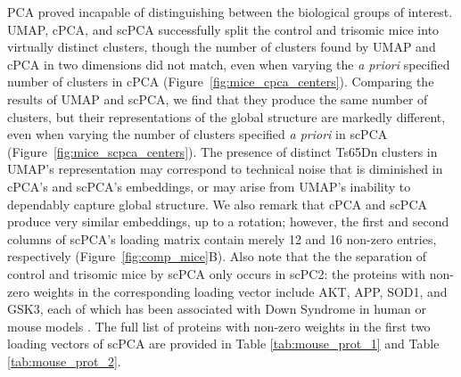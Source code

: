 \documentclass{article}
\begin{document}
PCA proved incapable of distinguishing between the biological groups of interest. UMAP, cPCA, and scPCA successfully split the control and trisomic mice into virtually distinct clusters, though the number of clusters found by UMAP and cPCA in two dimensions did not match, even when varying the \textit{a priori} specified number of clusters in cPCA (Figure~\ref{fig:mice_cpca_centers}). Comparing the results of UMAP and scPCA, we find that they produce the same number of clusters, but their representations of the global structure are markedly different, even when varying the number of clusters specified \textit{a priori} in scPCA (Figure~\ref{fig:mice_scpca_centers}). The presence of distinct Ts65Dn clusters in UMAP's representation may correspond to technical noise that is diminished in cPCA's and scPCA's embeddings, or may arise from UMAP's inability to dependably capture global structure. We also remark that cPCA and scPCA produce very similar embeddings, up to a rotation; however, the first and second columns of scPCA's loading matrix contain merely 12 and 16 non-zero entries, respectively (Figure~\ref{fig:comp_mice}B). Also note that the the separation of control and trisomic mice by scPCA only occurs in scPC2: the proteins with non-zero weights in the corresponding loading vector include AKT, APP, SOD1, and GSK3, each of which has been associated with Down Syndrome in human or mouse models \citep{Troca-Marn9445,Niceta2015,Gulesserian2001,Isacson2002}.  The full list of proteins with non-zero weights in the first two loading vectors of scPCA are provided in Table \ref{tab:mouse_prot_1} and  Table \ref{tab:mouse_prot_2}.
\end{document}
